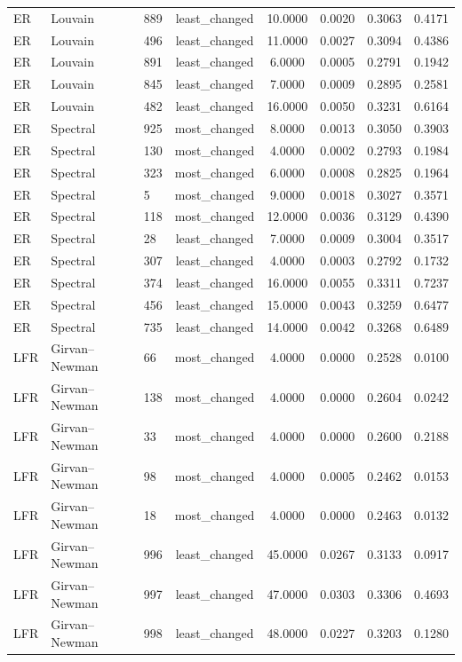 \begin{longtable}{lllccccc}
ER & Louvain & 889 & least\_changed & 10.0000 & 0.0020 & 0.3063 & 0.4171 \\
ER & Louvain & 496 & least\_changed & 11.0000 & 0.0027 & 0.3094 & 0.4386 \\
ER & Louvain & 891 & least\_changed & 6.0000 & 0.0005 & 0.2791 & 0.1942 \\
ER & Louvain & 845 & least\_changed & 7.0000 & 0.0009 & 0.2895 & 0.2581 \\
ER & Louvain & 482 & least\_changed & 16.0000 & 0.0050 & 0.3231 & 0.6164 \\
ER & Spectral & 925 & most\_changed & 8.0000 & 0.0013 & 0.3050 & 0.3903 \\
ER & Spectral & 130 & most\_changed & 4.0000 & 0.0002 & 0.2793 & 0.1984 \\
ER & Spectral & 323 & most\_changed & 6.0000 & 0.0008 & 0.2825 & 0.1964 \\
ER & Spectral & 5 & most\_changed & 9.0000 & 0.0018 & 0.3027 & 0.3571 \\
ER & Spectral & 118 & most\_changed & 12.0000 & 0.0036 & 0.3129 & 0.4390 \\
ER & Spectral & 28 & least\_changed & 7.0000 & 0.0009 & 0.3004 & 0.3517 \\
ER & Spectral & 307 & least\_changed & 4.0000 & 0.0003 & 0.2792 & 0.1732 \\
ER & Spectral & 374 & least\_changed & 16.0000 & 0.0055 & 0.3311 & 0.7237 \\
ER & Spectral & 456 & least\_changed & 15.0000 & 0.0043 & 0.3259 & 0.6477 \\
ER & Spectral & 735 & least\_changed & 14.0000 & 0.0042 & 0.3268 & 0.6489 \\
LFR & Girvan--Newman & 66 & most\_changed & 4.0000 & 0.0000 & 0.2528 & 0.0100 \\
LFR & Girvan--Newman & 138 & most\_changed & 4.0000 & 0.0000 & 0.2604 & 0.0242 \\
LFR & Girvan--Newman & 33 & most\_changed & 4.0000 & 0.0000 & 0.2600 & 0.2188 \\
LFR & Girvan--Newman & 98 & most\_changed & 4.0000 & 0.0005 & 0.2462 & 0.0153 \\
LFR & Girvan--Newman & 18 & most\_changed & 4.0000 & 0.0000 & 0.2463 & 0.0132 \\
LFR & Girvan--Newman & 996 & least\_changed & 45.0000 & 0.0267 & 0.3133 & 0.0917 \\
LFR & Girvan--Newman & 997 & least\_changed & 47.0000 & 0.0303 & 0.3306 & 0.4693 \\
LFR & Girvan--Newman & 998 & least\_changed & 48.0000 & 0.0227 & 0.3203 & 0.1280 \\

\end{longtable}
